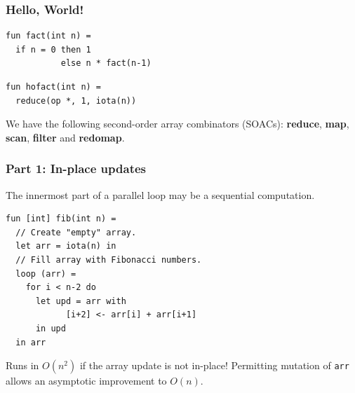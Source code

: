 \documentclass[rgb,dvipsnames]{beamer}
\newcommand{\LO}{$\mathcal{L}_0$}
\begin{document}

\begin{frame}[fragile]
  \frametitle{Hello, World!}

\begin{lstlisting}
fun fact(int n) =
  if n = 0 then 1
           else n * fact(n-1)
\end{lstlisting}

\begin{lstlisting}
fun hofact(int n) =
  reduce(op *, 1, iota(n))
\end{lstlisting}

  We have the following second-order array combinators (SOACs):
  \textbf{reduce}, \textbf{map}, \textbf{scan}, \textbf{filter} and
  \textbf{redomap}.

\end{frame}

\begin{frame}[fragile]
  \frametitle{Part 1: In-place updates}

  The innermost part of a parallel loop may be a sequential
  computation.

\begin{lstlisting}
fun [int] fib(int n) =
  // Create "empty" array.
  let arr = iota(n) in
  // Fill array with Fibonacci numbers.
  loop (arr) =
    for i < n-2 do
      let upd = arr with
            [i+2] <- arr[i] + arr[i+1]
      in upd
  in arr
\end{lstlisting}

\begin{mdframed}
  Runs in $O(n^{2})$ if the array update is not in-place!  Permitting
  mutation of \texttt{arr} allows an asymptotic improvement to $O(n)$.
\end{mdframed}

\end{frame}
\end{document}
